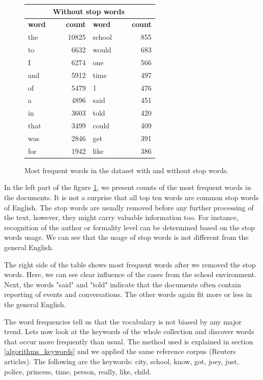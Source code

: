 \documentclass[
  digital, %
  table,   %
  lof,     %
  lot,     %
]{fithesis3}
\begin{document}
\begin{figure}[h]
\centering
\caption{Most frequent words in the dataset with and without stop words.}
\label{fig:most_frequent}
\footnotesize
\begin{tabular}{|l|r||l|r|}\hline
\rowcolor{orange!50}
\multicolumn{2}{|c||}{\makebox[9em]{\textbf{All words}}} & \multicolumn{2}{|c|}{\textbf{Without stop words}} \\\hline\hline
\textbf{word} & \textbf{count} & \textbf{word} & \textbf{count} \\\hline\hline
the & 10825 & school & 855 \\\hline
to & 6632 & would & 683 \\\hline
I & 6274 & one & 566 \\\hline
and & 5912 & time & 497 \\\hline
of & 5479 & 1 & 476 \\\hline
a & 4896 & said & 451 \\\hline
in & 3603 & told & 420 \\\hline
that & 3499 & could & 409 \\\hline
was & 2846 & get & 391 \\\hline
for & 1942 & like & 386 \\\hline
\end{tabular}
\normalsize
\end{figure}

In the left part of the figure \ref{fig:most_frequent}, we present counts of the most frequent words in the documents.
It is not a surprise that all top ten words are common stop words of English.
The stop words are usually removed before any further processing of the text, however, they might carry valuable information too.
For instance, recognition of the author or formality level can be determined based on the stop words usage.
We can see that the usage of stop words is not different from the general English.

The right side of the table shows most frequent words after we removed the stop words.
Here, we can see clear influence of the cases from the school environment.
Next, the words "said" and "told" indicate that the documents often contain reporting of events and conversations.
The other words again fit more or less in the general English.

The word frequencies tell us that the vocabulary is not biased by any major trend.
Lets now look at the keywords of the whole collection and discover words that occur more frequently than usual.
The method used is explained in section \ref{algorithms_keywords} and we applied the same reference corpus (Reuters articles).
The following are the keywords: city, school, know, got, joey, just, police, princess, time, person, really, like, child.
\end{document}
